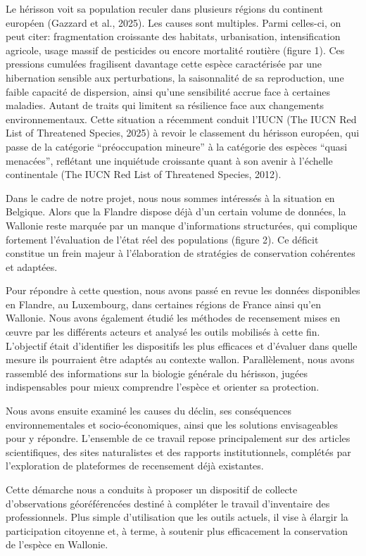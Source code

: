 \documentclass[a4paper,11pt]{article}
\begin{document}
Le hérisson voit sa population reculer dans plusieurs régions du continent européen (Gazzard et al., 2025). Les causes sont multiples. Parmi celles-ci, on peut citer: fragmentation croissante des habitats, urbanisation, intensification agricole, usage massif de pesticides ou encore mortalité routière (figure 1). Ces pressions cumulées fragilisent davantage cette espèce caractérisée par une hibernation sensible aux perturbations, la saisonnalité de sa reproduction, une faible capacité de dispersion, ainsi qu’une sensibilité accrue face à certaines maladies. Autant de traits qui limitent sa résilience face aux changements environnementaux. Cette situation a récemment conduit l’IUCN (The IUCN Red List of Threatened Species, 2025) à revoir le classement du hérisson européen, qui passe de la catégorie \enquote{préoccupation mineure} à la catégorie des espèces \enquote{quasi menacées}, reflétant une inquiétude croissante quant à son avenir à l’échelle continentale (The IUCN Red List of Threatened Species, 2012).

Dans le cadre de notre projet, nous nous sommes intéressés à la situation en Belgique. Alors que la Flandre dispose déjà d’un certain volume de données, la Wallonie reste marquée par un manque d’informations structurées, qui complique fortement l’évaluation de l’état réel des populations (figure 2). Ce déficit constitue un frein majeur à l’élaboration de stratégies de conservation cohérentes et adaptées.

Pour répondre à cette question, nous avons passé en revue les données disponibles en Flandre, au Luxembourg, dans certaines régions de France ainsi qu’en Wallonie. Nous avons également étudié les méthodes de recensement mises en œuvre par les différents acteurs et analysé les outils mobilisés à cette fin. L’objectif était d’identifier les dispositifs les plus efficaces et d’évaluer dans quelle mesure ils pourraient être adaptés au contexte wallon. Parallèlement, nous avons rassemblé des informations sur la biologie générale du hérisson, jugées indispensables pour mieux comprendre l’espèce et orienter sa protection.

Nous avons ensuite examiné les causes du déclin, ses conséquences environnementales et socio-économiques, ainsi que les solutions envisageables pour y répondre. L’ensemble de ce travail repose principalement sur des articles scientifiques, des sites naturalistes et des rapports institutionnels, complétés par l’exploration de plateformes de recensement déjà existantes.

Cette démarche nous a conduits à proposer un dispositif de collecte d’observations géoréférencées destiné à compléter le travail d’inventaire des professionnels. Plus simple d’utilisation que les outils actuels, il vise à élargir la participation citoyenne et, à terme, à soutenir plus efficacement la conservation de l’espèce en Wallonie.
\end{document}
